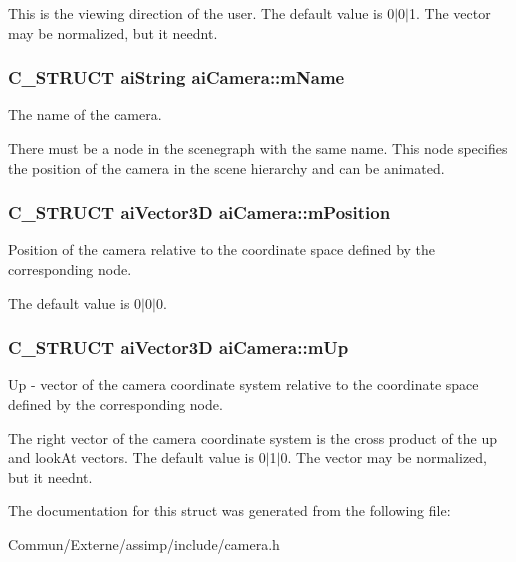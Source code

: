 This is the viewing direction of the user. The default value is 0$\vert$0$\vert$1. The vector may be normalized, but it needn\textquotesingle{}t. 
\subsubsection[{\texorpdfstring{m\+Name}{mName}}]{\setlength{\rightskip}{0pt plus 5cm}C\+\_\+\+S\+T\+R\+U\+CT {\bf ai\+String} ai\+Camera\+::m\+Name}\hypertarget{structai_camera_aa6a5fe5e04b3db1b23f69eb9910c6816}{}\label{structai_camera_aa6a5fe5e04b3db1b23f69eb9910c6816}
The name of the camera.

There must be a node in the scenegraph with the same name. This node specifies the position of the camera in the scene hierarchy and can be animated. 
\subsubsection[{\texorpdfstring{m\+Position}{mPosition}}]{\setlength{\rightskip}{0pt plus 5cm}C\+\_\+\+S\+T\+R\+U\+CT {\bf ai\+Vector3D} ai\+Camera\+::m\+Position}\hypertarget{structai_camera_a518617ea192ca0698e748a4399e7c3a5}{}\label{structai_camera_a518617ea192ca0698e748a4399e7c3a5}
Position of the camera relative to the coordinate space defined by the corresponding node.

The default value is 0$\vert$0$\vert$0. 
\subsubsection[{\texorpdfstring{m\+Up}{mUp}}]{\setlength{\rightskip}{0pt plus 5cm}C\+\_\+\+S\+T\+R\+U\+CT {\bf ai\+Vector3D} ai\+Camera\+::m\+Up}\hypertarget{structai_camera_a7fb42b287389b4f99c883098268d6d1a}{}\label{structai_camera_a7fb42b287389b4f99c883098268d6d1a}
\textquotesingle{}Up\textquotesingle{} -\/ vector of the camera coordinate system relative to the coordinate space defined by the corresponding node.

The \textquotesingle{}right\textquotesingle{} vector of the camera coordinate system is the cross product of the up and look\+At vectors. The default value is 0$\vert$1$\vert$0. The vector may be normalized, but it needn\textquotesingle{}t. 

The documentation for this struct was generated from the following file\+:\begin{DoxyCompactItemize}
\item 
Commun/\+Externe/assimp/include/camera.\+h\end{DoxyCompactItemize}
